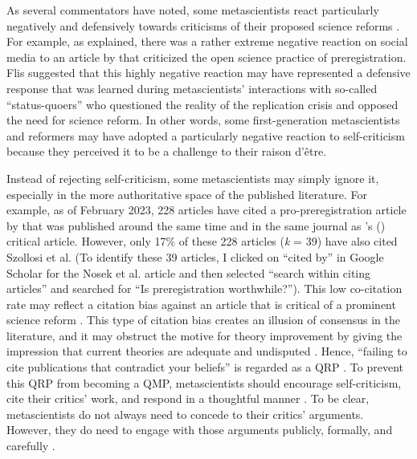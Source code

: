 \documentclass[authordate, meta, issue]{jote-new-article}
\begin{document}
As several commentators have noted, some metascientists react particularly negatively and defensively towards criticisms of their proposed science reforms \parencites{Bastian2021}{Gervais2021}[p. 5]{Malich2022}[p. 132]{Walkup2021}. For example, as \textcite{Flis2022} explained, there was a rather extreme negative reaction on social media to an article by \textcite{Szollosi2020} that criticized the open science practice of preregistration. Flis suggested that this highly negative reaction may have represented a defensive response that was learned during metascientists’ interactions with so-called “status-quoers” who questioned the reality of the replication crisis and opposed the need for science reform. In other words, some first-generation metascientists and reformers may have adopted a particularly negative reaction to self-criticism because they perceived it to be a challenge to their raison d’être.



Instead of rejecting self-criticism, some metascientists may simply ignore it, especially in the more authoritative space of the published literature. For example, as of February 2023, 228 articles have cited a pro-preregistration article by \textcite{Nosek2019} that was published around the same time and in the same journal as \citeauthor{Szollosi2020}'s \mbox{(\hspace*{-.21em}\citeyear{Szollosi2020})} critical article. However, only 17\% of these 228 articles (\emph{k }= 39) have also cited Szollosi et al. (To identify these 39 articles, I clicked on “cited by” in Google Scholar for the Nosek et al. article and then selected “search within citing articles” and searched for “Is preregistration worthwhile?”). This low co-citation rate may reflect a citation bias against an article that is critical of a prominent science reform \parencites[for another example of potential citation bias, please see][p. 6]{Flis2022}. This type of citation bias creates an illusion of consensus in the literature, and it may obstruct the motive for theory improvement by giving the impression that current theories are adequate and undisputed \parencites[see also][]{Bishop2020}[p. 1604]{Hoekstra2021}. Hence, “failing to cite publications that contradict your beliefs” is regarded as a QRP \parencites[p. 8]{Allum2023}. To prevent this QRP from becoming a QMP, metascientists should encourage self-criticism, cite their critics’ work, and respond in a thoughtful manner \parencites{Altenmüller2021}[p. 828]{Gervais2021}[p. 235]{Haig2022}[p. 1604]{Hoekstra2021}. To be clear, metascientists do not always need to concede to their critics’ arguments. However, they do need to engage with those arguments publicly, formally, and carefully \parencites[see also][]{Longino1990}.
\end{document}
